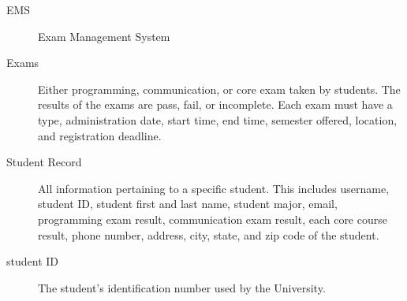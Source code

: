 
\begin{description}
   \item[EMS] Exam Management System 
   \item[Exams]  Either programming, communication, or core exam taken by students.
      The results of the exams are pass, fail, or incomplete. Each exam must
      have a type, administration date, start time, end time, semester offered,
      location, and registration deadline.
   \item[Student Record]  All information pertaining to a specific student. This
      includes username, student ID, student first and last name, student major,
      email, programming exam result, communication exam result, each core
      course result, phone number, address, city, state, and zip code of the
      student.
   \item[student ID] The student's identification number used by the University.
\end{description}
